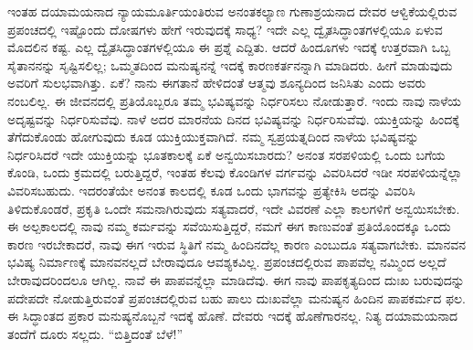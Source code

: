 ಇಂತಹ ದಯಾಮಯನಾದ ನ್ಯಾಯಮೂರ್ತಿಯಂತಿರುವ ಅನಂತಕಲ್ಯಾಣ ಗುಣಾಶ್ರಯನಾದ ದೇವರ ಆಳ್ವಿಕೆಯಲ್ಲಿರುವ ಪ್ರಪಂಚದಲ್ಲಿ ಇಷ್ಟೊಂದು ದೋಷಗಳು ಹೇಗೆ ಇರುವುದಕ್ಕೆ ಸಾಧ್ಯ? ಇದೇ ಎಲ್ಲ ದ್ವೈತಸಿದ್ಧಾಂತಗಳಲ್ಲಿಯೂ ಏಳುವ ಮೊದಲಿನ ಕಷ್ಟ. ಎಲ್ಲ ದ್ವೈತಸಿದ್ಧಾಂತಗಳಲ್ಲಿಯೂ ಈ ಪ್ರಶ್ನೆ ಎದ್ದಿತು. ಆದರೆ ಹಿಂದೂಗಳು ಇದಕ್ಕೆ ಉತ್ತರವಾಗಿ ಒಬ್ಬ ಸೈತಾನನನ್ನು ಸೃಷ್ಟಿಸಲಿಲ್ಲ; ಒಮ್ಮತದಿಂದ ಮನುಷ್ಯನನ್ನೆ ಇದಕ್ಕೆ ಕಾರಣ\break ಕರ್ತನನ್ನಾಗಿ ಮಾಡಿದರು. ಹೀಗೆ ಮಾಡುವುದು ಅವರಿಗೆ ಸುಲಭವಾಗಿತ್ತು. ಏಕೆ? ನಾನು ಈಗತಾನೆ ಹೇಳಿದಂತೆ ಆತ್ಮವು ಶೂನ್ಯದಿಂದ ಜನಿಸಿತು ಎಂದು ಅವರು ನಂಬಲಿಲ್ಲ. ಈ ಜೀವನದಲ್ಲಿ ಪ್ರತಿಯೊಬ್ಬರೂ ತಮ್ಮ ಭವಿಷ್ಯವನ್ನು ನಿರ್ಧರಿಸಲು ನೋಡುತ್ತಾರೆ. ಇಂದು ನಾವು ನಾಳೆಯ ಅದೃಷ್ಟವನ್ನು ನಿರ್ಧರಿಸುವೆವು. ನಾಳೆ ಅದರ ಮಾರನೆಯ ದಿನದ ಭವಿಷ್ಯವನ್ನು ನಿರ್ಧರಿಸುವೆವು. ಯುಕ್ತಿಯನ್ನು ಹಿಂದಕ್ಕೆ ತೆಗೆದುಕೊಂಡು ಹೋಗುವುದು ಕೂಡ ಯುಕ್ತಿಯುಕ್ತವಾಗಿದೆ. ನಮ್ಮ ಸ್ವಪ್ರಯತ್ನದಿಂದ ನಾಳೆಯ ಭವಿಷ್ಯವನ್ನು ನಿರ್ಧರಿಸಿದರೆ ಇದೇ ಯುಕ್ತಿಯನ್ನು ಭೂತಕಾಲಕ್ಕೆ ಏಕೆ ಅನ್ವಯಿಸಬಾರದು? ಅನಂತ ಸರಪಳಿಯಲ್ಲಿ ಒಂದು ಬಗೆಯ ಕೊಂಡಿ, ಒಂದು ಕ್ರಮದಲ್ಲಿ ಬರುತ್ತಿದ್ದರೆ, ಇಂತಹ ಕೆಲವು ಕೊಂಡಿಗಳ ವರ್ಗವನ್ನು ವಿವರಿಸಿದರೆ ಇಡೀ ಸರಪಳಿಯನ್ನೆಲ್ಲಾ ವಿವರಿಸಬಹುದು. ಇದರಂತೆಯೇ ಅನಂತ ಕಾಲದಲ್ಲಿ ಕೂಡ ಒಂದು ಭಾಗವನ್ನು ಪ್ರತ್ಯೇಕಿಸಿ ಅದನ್ನು ವಿವರಿಸಿ ತಿಳಿದುಕೊಂಡರೆ, ಪ್ರಕೃತಿ ಒಂದೇ ಸಮನಾಗಿರುವುದು ಸತ್ಯವಾದರೆ, ಇದೇ ವಿವರಣೆ ಎಲ್ಲಾ ಕಾಲಗಳಿಗೆ ಅನ್ವಯಿಸಬೇಕು. ಈ ಅಲ್ಪಕಾಲದಲ್ಲಿ ನಾವು ನಮ್ಮ ಕರ್ಮವನ್ನು ಸವೆಯಿಸುತ್ತಿದ್ದರೆ, ನಮಗೆ ಈಗ ಕಾಣುವಂತೆ ಪ್ರತಿಯೊಂದಕ್ಕೂ ಒಂದು ಕಾರಣ ಇರಬೇಕಾದರೆ, ನಾವು ಈಗ ಇರುವ ಸ್ಥಿತಿಗೆ ನಮ್ಮ ಹಿಂದಿನದೆಲ್ಲ ಕಾರಣ ಎಂಬುದೂ ಸತ್ಯವಾಗಬೇಕು. ಮಾನವನ ಭವಿಷ್ಯ ನಿರ್ಮಾಣಕ್ಕೆ ಮಾನವನಲ್ಲದೆ ಬೇರಾವುದೂ ಆವಶ್ಯಕವಿಲ್ಲ. ಪ್ರಪಂಚದಲ್ಲಿರುವ ಪಾಪವೆಲ್ಲ ನಮ್ಮಿಂದ ಅಲ್ಲದೆ ಬೇರಾವುದರಿಂದಲೂ ಆಗಿಲ್ಲ. ನಾವೆ ಈ ಪಾಪವನ್ನೆಲ್ಲಾ ಮಾಡಿದೆವು. ಈಗ ನಾವು ಪಾಪಕೃತ್ಯದಿಂದ ದುಃಖ ಬರುವುದನ್ನು ಪದೇಪದೇ ನೋಡುತ್ತಿರುವಂತೆ ಪ್ರಪಂಚದಲ್ಲಿರುವ ಬಹು ಪಾಲು ದುಃಖವೆಲ್ಲಾ ಮನುಷ್ಯನ ಹಿಂದಿನ ಪಾಪಕರ್ಮದ ಫಲ. ಈ ಸಿದ್ಧಾಂತದ ಪ್ರಕಾರ ಮನುಷ್ಯನೊಬ್ಬನೆ ಇದಕ್ಕೆ ಹೊಣೆ. ದೇವರು ಇದಕ್ಕೆ ಹೊಣೆಗಾರನಲ್ಲ. ನಿತ್ಯ ದಯಾಮಯನಾದ ತಂದೆಗೆ ದೂರು ಸಲ್ಲದು. “ಬಿತ್ತಿದಂತೆ ಬೆಳೆ!”

\vskip 0.2cm

